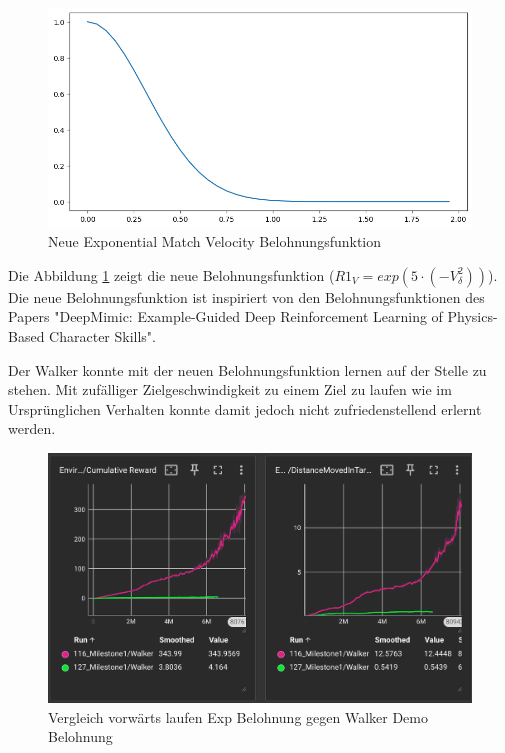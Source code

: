 \begin{figure}[H]
  \centering  
  \includegraphics[scale=0.5]{img/match_velocity_exp.png}
  \caption{Neue Exponential Match Velocity Belohnungsfunktion}
  \label{fig:match_velocity_exp}
\end{figure}
Die Abbildung \ref{fig:match_velocity_exp} zeigt die neue Belohnungsfunktion ($R1_V=exp(5 \cdot (-V_\delta^2))$). Die neue Belohnungsfunktion ist inspiriert von den Belohnungsfunktionen des Papers "DeepMimic: Example-Guided Deep Reinforcement Learning of Physics-Based Character Skills".\cite{peng2018deepmimic}

Der Walker konnte mit der neuen Belohnungsfunktion lernen auf der Stelle zu stehen. Mit zufälliger Zielgeschwindigkeit zu einem Ziel zu laufen wie im Ursprünglichen Verhalten konnte damit jedoch nicht zufriedenstellend erlernt werden.

\begin{figure}[H]
  \centering  
  \includegraphics[scale=0.5]{img/training_exp_belohnung.png}
  \caption{Vergleich vorwärts laufen Exp Belohnung gegen Walker Demo Belohnung}
  \label{fig:training_exp_belohnung}
\end{figure}

